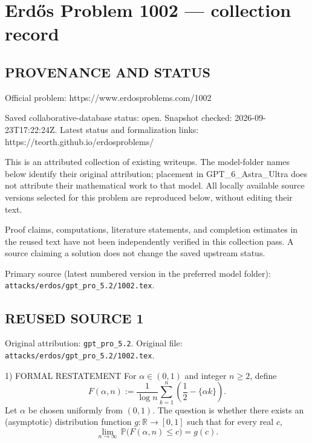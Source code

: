 \section*{Erd\H{o}s Problem 1002 --- collection record}

\subsection*{PROVENANCE AND STATUS}
Official problem: https://www.erdosproblems.com/1002

Saved collaborative-database status: open.
Snapshot checked: 2026-09-23T17:22:24Z.
Latest status and formalization links: https://teorth.github.io/erdosproblems/

This is an attributed collection of existing writeups. The model-folder names below identify their original attribution; placement in GPT\_6\_Astra\_Ultra does not attribute their mathematical work to that model. All locally available source versions selected for this problem are reproduced below, without editing their text.

Proof claims, computations, literature statements, and completion estimates in the reused text have not been independently verified in this collection pass. A source claiming a solution does not change the saved upstream status.

Primary source (latest numbered version in the preferred model folder): \texttt{attacks/erdos/gpt\_pro\_5.2/1002.tex}.

\subsection*{REUSED SOURCE 1}
Original attribution: \texttt{gpt\_pro\_5.2}.
Original file: \texttt{attacks/erdos/gpt\_pro\_5.2/1002.tex}.


1) FORMAL RESTATEMENT
For $\alpha\in(0,1)$ and integer $n\ge 2$, define
\[
F(\alpha,n) := \frac{1}{\log n}\sum_{k=1}^n \left(\frac12 - \{\alpha k\}\right).
\]
Let $\alpha$ be chosen uniformly from $(0,1)$.  The question is whether there exists an (asymptotic) distribution function $g:\mathbb{R}\to[0,1]$ such that for every real $c$,
\[
\lim_{n\to\infty}\,\mathbb{P}\bigl(F(\alpha,n)\le c\bigr)=g(c).
\]

